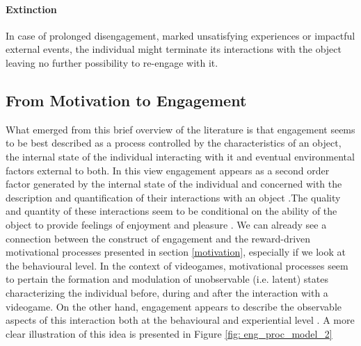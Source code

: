 \paragraph*{Extinction} In case of prolonged disengagement, marked unsatisfying experiences or impactful external events, the individual might terminate its interactions with the object leaving no further possibility to re-engage with it.

\subsection{From Motivation to Engagement}
\label{eng_reward_motivation}
What emerged from this brief overview of the literature is that engagement seems to be best described as a process controlled by the characteristics of an object, the internal state of the individual interacting with it and eventual environmental factors external to both. In this view engagement appears as a second order factor generated by the internal state of the individual and concerned with the description and quantification  of their interactions with an object  \cite{lucas2004sex,o2008user,jennett2008measuring,boyle2012engagement,connolly2012systematic,csikszentmihalyi2014toward}.The quality and quantity of these interactions seem to be conditional on the ability of the object to provide feelings of enjoyment and pleasure \cite{lucas2004sex,o2008user,jennett2008measuring,boyle2012engagement,connolly2012systematic,csikszentmihalyi2014toward}. We can already see a connection between the construct of engagement and the reward-driven motivational processes presented in section \ref{motivation}, especially if we look at the behavioural level. In the context of videogames, motivational processes seem to pertain the formation and modulation of unobservable (i.e. latent) states characterizing the individual before, during and after the interaction with a videogame. On the other hand, engagement appears to describe the observable aspects of this interaction both at the behavioural and experiential level \cite{lucas2004sex,o2008user,jennett2008measuring,boyle2012engagement,connolly2012systematic,csikszentmihalyi2014toward}. A more clear illustration of this idea is presented in Figure \ref{fig: eng_proc_model_2} 

